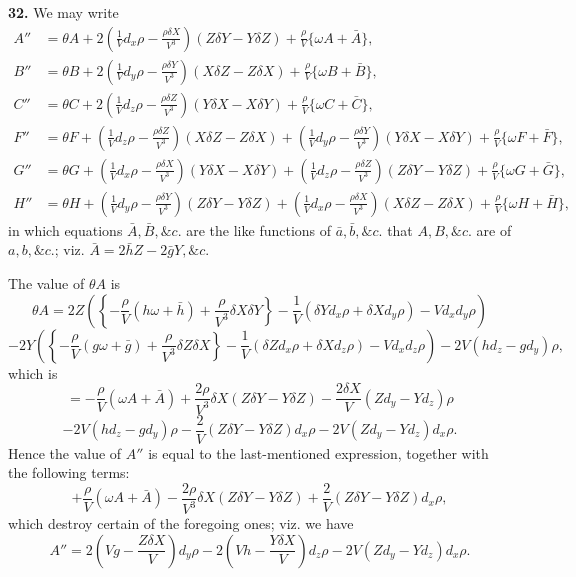 \documentclass[11pt,a4paper]{article}
\newcommand{\Dx}{d_x}
\newcommand{\Dy}{d_y}
\newcommand{\Dz}{d_z}
\begin{document}
\textbf{32.} We may write
\begin{align*}
A''&=\theta A+2\left(\frac1V\Dx\rho-\frac{\rho\delta X}{V^3}\right)(Z\delta Y-Y\delta Z)
       +\frac{\rho}{V}\{\omega A+\bar A\},\\
B''&=\theta B+2\left(\frac1V\Dy\rho-\frac{\rho\delta Y}{V^3}\right)(X\delta Z-Z\delta X)
       +\frac{\rho}{V}\{\omega B+\bar B\},\\
C''&=\theta C+2\left(\frac1V\Dz\rho-\frac{\rho\delta Z}{V^3}\right)(Y\delta X-X\delta Y)
       +\frac{\rho}{V}\{\omega C+\bar C\},\\
F''&=\theta F+\left(\frac1V\Dz\rho-\frac{\rho\delta Z}{V^3}\right)(X\delta Z-Z\delta X)
       +\left(\frac1V\Dy\rho-\frac{\rho\delta Y}{V^3}\right)(Y\delta X-X\delta Y)
       +\frac{\rho}{V}\{\omega F+\bar F\},\\
G''&=\theta G+\left(\frac1V\Dx\rho-\frac{\rho\delta X}{V^3}\right)(Y\delta X-X\delta Y)
       +\left(\frac1V\Dz\rho-\frac{\rho\delta Z}{V^3}\right)(Z\delta Y-Y\delta Z)
       +\frac{\rho}{V}\{\omega G+\bar G\},\\
H''&=\theta H+\left(\frac1V\Dy\rho-\frac{\rho\delta Y}{V^3}\right)(Z\delta Y-Y\delta Z)
       +\left(\frac1V\Dx\rho-\frac{\rho\delta X}{V^3}\right)(X\delta Z-Z\delta X)
       +\frac{\rho}{V}\{\omega H+\bar H\},
\end{align*}
in which equations \(\bar A,\bar B,\&c.\) are the like functions of \(\bar a,\bar b,\&c.\) that
\(A,B,\&c.\) are of \(a,b,\&c.\); viz. \(\bar A=2\bar hZ-2\bar gY,\&c.\)

\newpage
The value of \(\theta A\) is
\[
\theta A=2Z\left(\left\{-\frac{\rho}{V}(h\omega+\bar h)+\frac{\rho}{V^3}\delta X\delta Y\right\}
-\frac1V(\delta Y\Dx\rho+\delta X\Dy\rho)-V\Dx\Dy\rho\right)
\]
\[
-2Y\left(\left\{-\frac{\rho}{V}(g\omega+\bar g)+\frac{\rho}{V^3}\delta Z\delta X\right\}
-\frac1V(\delta Z\Dx\rho+\delta X\Dz\rho)-V\Dx\Dz\rho\right)
-2V(h\Dz-g\Dy)\rho,
\]
which is
\[
=-\frac{\rho}{V}(\omega A+\bar A)+\frac{2\rho}{V^3}\delta X(Z\delta Y-Y\delta Z)
-\frac{2\delta X}{V}(Z\Dy-Y\Dz)\rho
\]
\[
-2V(h\Dz-g\Dy)\rho
-\frac2V(Z\delta Y-Y\delta Z)\Dx\rho
-2V(Z\Dy-Y\Dz)\Dx\rho.
\]
Hence the value of \(A''\) is equal to the last-mentioned expression, together with the following terms:
\[
+\frac{\rho}{V}(\omega A+\bar A)
-\frac{2\rho}{V^3}\delta X(Z\delta Y-Y\delta Z)
+\frac2V(Z\delta Y-Y\delta Z)\Dx\rho,
\]
which destroy certain of the foregoing ones; viz. we have
\[
A''=2\left(Vg-\frac{Z\delta X}{V}\right)\Dy\rho
-2\left(Vh-\frac{Y\delta X}{V}\right)\Dz\rho
-2V(Z\Dy-Y\Dz)\Dx\rho.
\]
\end{document}

